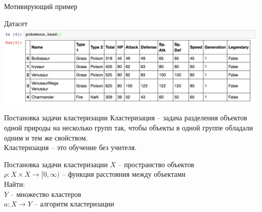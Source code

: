 \documentclass[10pt]{beamer}
\begin{document}
{\begin{frame}{Мотивирующий пример}
\begin{figure}
	    \qquad 
	    \qquad
	    \qquad
	\end{figure}
\end{frame}
}

\begin{frame}{Датасет}
    \centering
	\includegraphics[width=\textwidth]{../lecture2/images/pokemons}
\end{frame}

\begin{frame}{Постановка задачи кластеризации}
  Кластеризация -- задача разделения объектов одной природы на несколько групп так, чтобы объекты в одной группе обладали одним и тем же свойством.\\
  \bigbreak
  Кластеризация -- это обучение без учителя.
\end{frame}

\begin{frame}{Постановка задачи кластеризации}
	$X$ -- пространство объектов\\
	$\rho: X \times X \rightarrow [0, \infty)$ -- функция расстояния между объектами\\
	\bigbreak
	\alert{Найти}:\\
	$Y$ -- множество кластеров \\
	$a: X \rightarrow Y$ -- алгоритм кластеризации
\end{frame}
\end{document}
